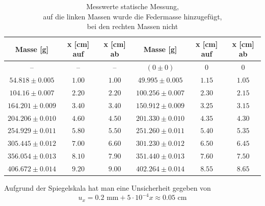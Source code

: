 \documentclass[bibliography=totocnumbered]{scrartcl}
\begin{document}
	\begin{table}[ht!]
		\centering
		\caption{Messwerte statische Messung, \\
			auf die linken Massen wurde die Federmasse hinzugefügt, \\
		bei den rechten Massen nicht}
		\begin{tabular}{|c|c|c||c|c|c|}
			\hline
			Masse [g]& x [cm] auf &x [cm] ab & Masse [g] &x [cm] auf&   x [cm] ab   \\
			\hline
		--	&--  & -- & $ (0\pm 0) $  &0&0 \\
			\hline
			$ 54.818\pm 0.005$&$ 1.00 $  & $ 1.00 $ & $49.995\pm 0.005  $ &$ 1.15$& $  1.05   $  \\
			\hline
			$ 104.16\pm 0.007  $& $ 2.20 $ & $ 2.20  $ & $ 100.256\pm0.007 $ &$ 2.30  $&  $ 2.15  $\\
			\hline
			$ 164.201\pm0.009 $&$ 3.40   $  & $ 3.40   $& $ 150.912\pm0.009 $ &$ 3.25  $&$ 3.15  $   \\
			\hline
			$ 204.206\pm 0.010$&$ 4.60 $  & $ 4.50  $ & $ 201.330\pm 0.010 $ &$ 4.35 $& $ 4.30  $ \\
			\hline
			$ 254.929\pm0.011 $& $ 5.80  $ & $ 5.50  $ & $251.260 \pm0.011 $ &$  5.40  $&$ 5.35  $  \\
			\hline
			$ 305.445\pm 0.012$& $ 7.00  $ & $ 6.60  $ & $301.230 \pm 0.012 $ &$ 6.50  $ & $6.45  $\\
			\hline
			$ 356.054\pm 0.013$& $ 8.10  $ &$ 7.90  $  & $ 351.440\pm 0.013 $ & $ 7.60  $&$ 7.50  $ \\
			\hline
			$ 406.672\pm0.014 $& $ 9.20   $& $ 9.00  $ & $402.264 \pm0.014 $ &$  8.55 $ & $ 8.65  $\\
			\hline
		\end{tabular}
		\label{tab: Mw statische Messung}
	\end{table}
	Aufgrund der Spiegelskala hat man eine Unsicherheit gegeben von
	\begin{equation}
		u_{x}=0.2\text{ mm} + 5\cdot 10^{-4}x \approx 0.05\text{ cm}
	\end{equation}
\end{document}
